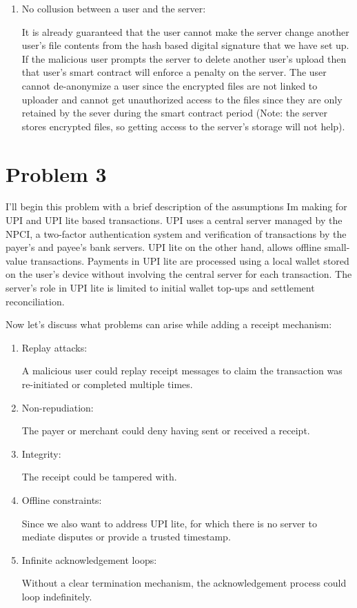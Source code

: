 \documentclass{ashoka-crypto}
\begin{document}
\begin{enumerate}
\item No collusion between a user and the server:

It is already guaranteed that the user cannot make the server change another user's file contents from the hash based digital signature that we have set up. If the malicious user prompts the server to delete another user's upload then that user's smart contract will enforce a penalty on the server. The user cannot de-anonymize a user since the encrypted files are not linked to uploader and cannot get unauthorized access to the files since they are only retained by the sever during the smart contract period (Note: the server stores encrypted files, so getting access to the server's storage will not help).

\end{enumerate}

\clearpage

\section*{Problem 3}

I'll begin this problem with a brief description of the assumptions Im making for UPI and UPI lite based transactions. UPI uses a central server managed by the NPCI, a two-factor authentication system and verification of transactions by the payer's and payee's bank servers. UPI lite on the other hand, allows offline small-value transactions. Payments in UPI lite are processed using a local wallet stored on the user's device without involving the central server for each transaction. The server's role in UPI lite is limited to initial wallet top-ups and settlement reconciliation.

Now let's discuss what problems can arise while adding a receipt mechanism:
\begin{enumerate}
\item Replay attacks:

A malicious user could replay receipt messages to claim the transaction was re-initiated or completed multiple times.
\item Non-repudiation:

The payer or merchant could deny having sent or received a receipt.

\item Integrity:

The receipt could be tampered with.

\item Offline constraints:

Since we also want to address UPI lite, for which there is no server to mediate disputes or provide a trusted timestamp.

\item Infinite acknowledgement loops:

Without a clear termination mechanism, the acknowledgement process could loop indefinitely.
\end{enumerate}
\end{document}
